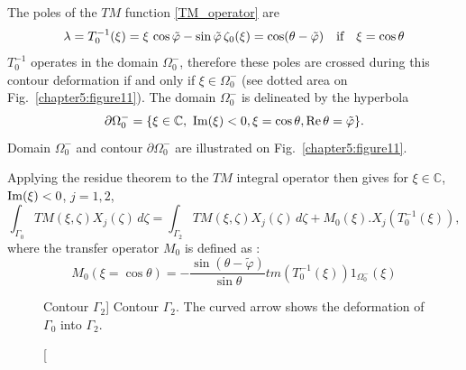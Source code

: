 The poles of the $TM$ function \eqref{TM_operator} are
$$ \lambda = T_0^{-1}(\xi) = \xi \, \cos \tilde{\varphi}  - \sin \tilde{\varphi} \, \zeta_0(\xi) = \cos (\theta - \tilde{\varphi}) \quad \text{if} \quad \xi = \cos \theta $$
$T_0^{-1}$ operates in the domain $\Omega_0^-$, therefore these poles are crossed during this contour deformation if and only if $\xi \in \Omega_0^-$ (see dotted area on Fig.~\ref{chapter5:figure11}).
The domain $\Omega_0^-$ is delineated by the hyperbola 
\begin{equation}
\partial \Omega_0^- = \{   \xi \in \mathbb{C}, \ {\rm Im}(\xi) <0,  \xi = \cos \theta, {\rm Re} \, \theta = \tilde{\varphi} \}.
\end{equation}
Domain $\Omega_0^-$ and contour $\partial \Omega_0^-$ are illustrated on Fig.~\ref{chapter5:figure11}.   

Applying the residue theorem to the $TM$ integral operator then gives for $\xi \in \mathbb{C}$, ${\rm Im}(\xi) <0$, $j=1,2$,
\begin{equation}
\label{TM_propag_sol}
\int_{\Gamma_0} TM(\xi,\zeta)X_j(\zeta)\, d\zeta = \int_{\Gamma_2}  TM(\xi,\zeta)X_j(\zeta)\, d\zeta+M_0(\xi).X_j(T^{-1}_0(\xi)),
\end{equation}
where the transfer operator $M_0$ is defined as :
\begin{equation}
\label{defM0}
M_0(\xi=\cos\theta)=-\frac{\sin(\theta-\tilde{\varphi})}{\sin\theta} tm(T_0^{-1}(\xi))1_{\Omega_0^-}(\xi)
\end{equation}

\begin{figure}[ht]%
\centering
{}
\caption
[Contour $\Gamma_2$]
{Contour $\Gamma_2$. The curved arrow shows the deformation of $\Gamma_0$ into $\Gamma_2$.}
\label{chapter5:figure8}
\end{figure}


